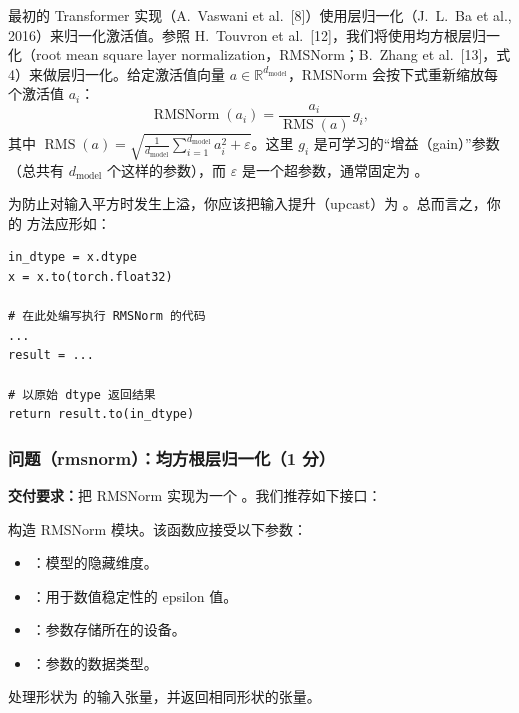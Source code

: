 最初的 Transformer 实现（A.~Vaswani et al.~[8]）使用层归一化（J.~L.~Ba et al., 2016）来归一化激活值。参照 H.~Touvron et al.~[12]，我们将使用均方根层归一化（root mean square layer normalization，RMSNorm；B.~Zhang et al.~[13]，式 4）来做层归一化。给定激活值向量 $a \in \mathbb{R}^{d_{\mathrm{model}}}$，RMSNorm 会按下式重新缩放每个激活值 $a_i$：
\begin{equation}
\operatorname{RMSNorm}(a_i) = \frac{a_i}{\operatorname{RMS}(a)}\, g_i,
\tag{4}
\end{equation}
其中 $\operatorname{RMS}(a) = \sqrt{\tfrac{1}{d_{\mathrm{model}}} \sum_{i=1}^{d_{\mathrm{model}}} a_i^2 + \varepsilon}$。这里 $g_i$ 是可学习的``增益（gain）''参数（总共有 $d_{\mathrm{model}}$ 个这样的参数），而 $\varepsilon$ 是一个超参数，通常固定为 。

为防止对输入平方时发生上溢，你应该把输入提升（upcast）为 。总而言之，你的  方法应形如：

\begin{lstlisting}
in_dtype = x.dtype
x = x.to(torch.float32)

# 在此处编写执行 RMSNorm 的代码
...
result = ...

# 以原始 dtype 返回结果
return result.to(in_dtype)
\end{lstlisting}

\subsubsection*{问题（rmsnorm）：均方根层归一化（1 分）}

\textbf{交付要求：}把 RMSNorm 实现为一个 。我们推荐如下接口：

\quad 构造 RMSNorm 模块。该函数应接受以下参数：
\begin{itemize}
  \item {}：模型的隐藏维度。
  \item {}：用于数值稳定性的 epsilon 值。
  \item {}：参数存储所在的设备。
  \item {}：参数的数据类型。
\end{itemize}

{\sloppy
{}\quad 处理形状为  的输入张量，并返回相同形状的张量。
\par}

